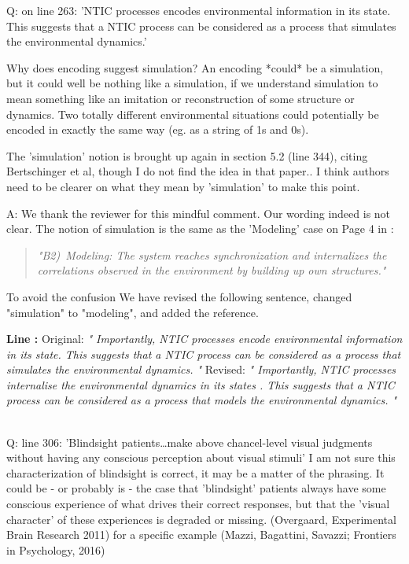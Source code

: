\documentclass[utf8]{article}
\newcounter{cQuestion}[section]
\newenvironment{question}
    {\refstepcounter{cQuestion}\color{Blue}\noindent\newline Q\thecQuestion:}
    {~\newline}
\newenvironment{ans}  
    {\color{Black}\noindent A:}
    {~\newline}
\newcommand{\revise}[3]{
	\newline
	\newline
    \noindent
    \textbf{Line #1:}
    \newline
    Original:\newline
    \textit{"#2"}
    \newline
    \newline
    Revised:\newline
    \textit{"#3"}\newline}
\begin{document}
    
    	\begin{question}
    		on line 263: 'NTIC processes encodes environmental information in its state. This suggests that a NTIC process can be considered as a process that simulates the environmental dynamics.'
    		
    		Why does encoding suggest simulation? An encoding *could* be a simulation, but it could well be nothing like a simulation, if we understand simulation to mean something like an imitation or reconstruction of some structure or dynamics. Two totally different environmental situations could potentially be encoded in exactly the same way (eg. as a string of 1s and 0s).
    		
    		The 'simulation' notion is brought up again in section 5.2 (line 344), citing Bertschinger et al, though I do not find the idea in that paper.. I think authors need to be clearer on what they mean by 'simulation' to make this point.
    	\end{question}
    
    	\begin{ans}
    		We thank the reviewer for this mindful comment. 
    		Our wording indeed is not clear. The notion of simulation is the same as the 'Modeling' case on Page 4 in \cite{BERTSCHINGER.2006}: 
    		\begin{quote}
		    	\textit{"B2)~Modeling: The system reaches synchronization and internalizes the correlations observed in the environment by building up own structures."}    	
    		\end{quote}    	
    	
    		To avoid the confusion We have revised the following sentence, changed "simulation" to "modeling", and added the reference.
    		\revise{}
    		{
    			Importantly, NTIC processes encode environmental information in its state. This suggests that a NTIC process can be considered as a process that simulates the environmental dynamics. }
    		{
    			Importantly, NTIC processes internalise the environmental dynamics in its states \citep[also see P.~4][]{BERTSCHINGER.2006}. This suggests that a NTIC process can be considered as a process that models the environmental dynamics.
    		}
    	\end{ans}
    
   	\begin{question}
			line 306: 'Blindsight patients\dots make above chancel-level visual judgments without having any conscious perception about visual stimuli' I am not sure this characterization of blindsight is correct, it may be a matter of the phrasing. It could be - or probably is - the case that 'blindsight' patients always have some conscious experience of what drives their correct responses, but that the 'visual character' of these experiences is degraded or missing.
			(Overgaard, Experimental Brain Research 2011)
			for a specific example
			(Mazzi, Bagattini, Savazzi; Frontiers in Psychology, 2016)
    	\end{question}
    
\end{document}
